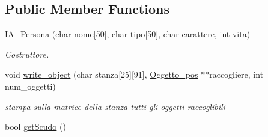 \subsection*{Public Member Functions}
\begin{DoxyCompactItemize}
\item 
\hyperlink{classIA__Persona_a450a8b02b473b9bc110d65a47326a069}{I\+A\+\_\+\+Persona} (char \hyperlink{classPersona_a15d4ded972e8bdd3f02e89c6ccb71b73}{nome}\mbox{[}50\mbox{]}, char \hyperlink{classPersona_ae7069f0467a3b2f1d269c1a143b730eb}{tipo}\mbox{[}50\mbox{]}, char \hyperlink{classPersona_a1fff44e46be477b79413387307b0aaff}{carattere}, int \hyperlink{classPersona_a1e784d3a56cddd6ba8e81387df1efc7b}{vita})
\begin{DoxyCompactList}\small\item\em Costruttore. \end{DoxyCompactList}\item 
void \hyperlink{classIA__Persona_ab8820ce00b02a098bf917e53bf297051}{write\+\_\+object} (char stanza\mbox{[}25\mbox{]}\mbox{[}91\mbox{]}, \hyperlink{structOggetto__pos}{Oggetto\+\_\+pos} $\ast$$\ast$raccogliere, int num\+\_\+oggetti)
\begin{DoxyCompactList}\small\item\em stampa sulla matrice della stanza tutti gli oggetti raccoglibili \end{DoxyCompactList}\item 
\hypertarget{classIA__Persona_a33a4375ebb8e374fd92c88759e28e492}{}bool \hyperlink{classIA__Persona_a33a4375ebb8e374fd92c88759e28e492}{get\+Scudo} ()\label{classIA__Persona_a33a4375ebb8e374fd92c88759e28e492}


\end{DoxyCompactItemize}
